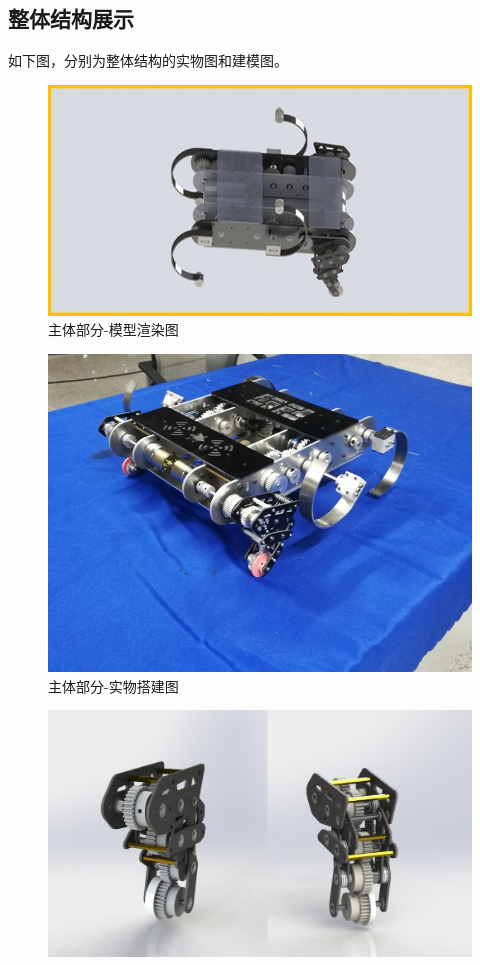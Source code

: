 \documentclass[12pt]{article}
\begin{document}
\begin{CJK}{UTF8}{gbsn}
\subsection{整体结构展示}
如下图，分别为整体结构的实物图和建模图。
\renewcommand {\thefigure} {\thesubsection{}.\arabic{figure}}
\begin{figure}[H]
\centering
\includegraphics[width=.8\textwidth]{chap2//fig2.jpg}
\caption{主体部分-模型渲染图}
\end{figure}
\begin{figure}[H]
\centering
\includegraphics[width=.8\textwidth]{chap2//fig1.jpg}
\caption{主体部分-实物搭建图}
\end{figure}
\begin{figure}[H]
\centering
\includegraphics[width=.8\textwidth]{chap2//figa.jpg}

\end{figure}
\end{CJK}
\end{document}
